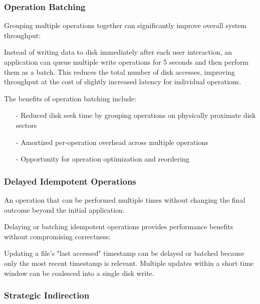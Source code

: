 \documentclass[../../compsys.tex]{subfiles}
\begin{document}
\subsubsection{Operation Batching}
Grouping multiple operations together can significantly improve overall system throughput:

\begin{example}
Instead of writing data to disk immediately after each user interaction, an application can queue multiple write operations for 5 seconds and then perform them as a batch. This reduces the total number of disk accesses, improving throughput at the cost of slightly increased latency for individual operations.
\end{example}

The benefits of operation batching include:
\begin{itemize}
  \item[-] Reduced disk seek time by grouping operations on physically proximate disk sectors
  \item[-] Amortized per-operation overhead across multiple operations
  \item[-] Opportunity for operation optimization and reordering
\end{itemize}

\subsubsection{Delayed Idempotent Operations}

\begin{definition}
An operation that can be performed multiple times without changing the final outcome beyond the initial application.
\end{definition}

Delaying or batching idempotent operations provides performance benefits without compromising correctness:

\begin{example}
Updating a file's "last accessed" timestamp can be delayed or batched because only the most recent timestamp is relevant. Multiple updates within a short time window can be coalesced into a single disk write.
\end{example}

\subsubsection{Strategic Indirection}
\end{document}
